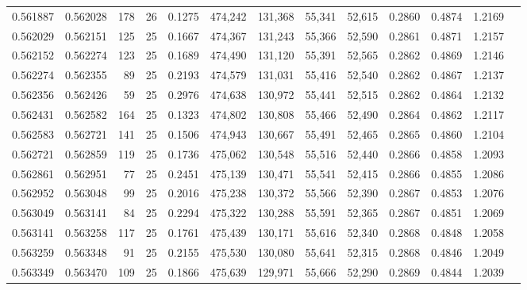 \begin{tabular}{rrrrrrrrrrrrr}
0.561887 & 0.562028 &   178 &  26 &                                     0.1275 & 474,242 & 131,368 &  55,341 &  52,615 & 0.2860 & 0.4874 & 1.2169 \\
0.562029 & 0.562151 &   125 &  25 &                                     0.1667 & 474,367 & 131,243 &  55,366 &  52,590 & 0.2861 & 0.4871 & 1.2157 \\
0.562152 & 0.562274 &   123 &  25 &                                     0.1689 & 474,490 & 131,120 &  55,391 &  52,565 & 0.2862 & 0.4869 & 1.2146 \\
0.562274 & 0.562355 &    89 &  25 &                                     0.2193 & 474,579 & 131,031 &  55,416 &  52,540 & 0.2862 & 0.4867 & 1.2137 \\
0.562356 & 0.562426 &    59 &  25 &                                     0.2976 & 474,638 & 130,972 &  55,441 &  52,515 & 0.2862 & 0.4864 & 1.2132 \\
0.562431 & 0.562582 &   164 &  25 &                                     0.1323 & 474,802 & 130,808 &  55,466 &  52,490 & 0.2864 & 0.4862 & 1.2117 \\
0.562583 & 0.562721 &   141 &  25 &                                     0.1506 & 474,943 & 130,667 &  55,491 &  52,465 & 0.2865 & 0.4860 & 1.2104 \\
0.562721 & 0.562859 &   119 &  25 &                                     0.1736 & 475,062 & 130,548 &  55,516 &  52,440 & 0.2866 & 0.4858 & 1.2093 \\
0.562861 & 0.562951 &    77 &  25 &                                     0.2451 & 475,139 & 130,471 &  55,541 &  52,415 & 0.2866 & 0.4855 & 1.2086 \\
0.562952 & 0.563048 &    99 &  25 &                                     0.2016 & 475,238 & 130,372 &  55,566 &  52,390 & 0.2867 & 0.4853 & 1.2076 \\
0.563049 & 0.563141 &    84 &  25 &                                     0.2294 & 475,322 & 130,288 &  55,591 &  52,365 & 0.2867 & 0.4851 & 1.2069 \\
0.563141 & 0.563258 &   117 &  25 &                                     0.1761 & 475,439 & 130,171 &  55,616 &  52,340 & 0.2868 & 0.4848 & 1.2058 \\
0.563259 & 0.563348 &    91 &  25 &                                     0.2155 & 475,530 & 130,080 &  55,641 &  52,315 & 0.2868 & 0.4846 & 1.2049 \\
0.563349 & 0.563470 &   109 &  25 &                                     0.1866 & 475,639 & 129,971 &  55,666 &  52,290 & 0.2869 & 0.4844 & 1.2039 \\

\end{tabular}
